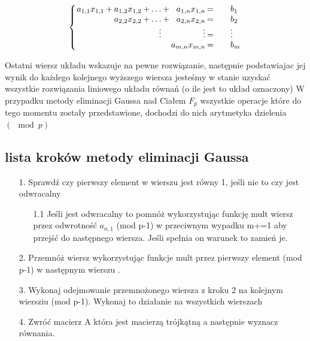 \documentclass{article}
\begin{document}
\begin{center}
\[
\setlength\arraycolsep{1pt}
\left\{
\begin{array}{rcrcrcrc@{\qquad}l}
a_{1,1}x_{1,1}  & +  &    a_{1,2}x_{1,2}    & + &   \ldots      & + &   a_{1,n}x_{1,n} &   =   &    b_{1} \\
                &    &   a_{2,2}x_{2,2}     & + &   \ldots      & + &   a_{2,n}x_{2,n} &   =   &    b_{2} \\
                &    &                      &   &   \vdots      &   &         \vdots   &   =   &    \vdots \\             
                &    &                      &   &               &   &   a_{m,n}x_{m,n} &   =   &    b_{m} \\
\end{array}
\right.
\]
\end{center}
 Ostatni wiersz układu wskazuje na pewne rozwiązanie, następnie podstawiajac jej wynik do każdego kolejnego wyższego wiersza jesteśmy w stanie uzyskać wszystkie rozwiązania liniowego układu równań (o ile jest to układ oznaczony)
\newline
\newline
W przypadku metody eliminacji Gaussa nad Ciałem \begin{math}  F_{p}  \end{math} wszystkie operacje które do tego momentu zostały przedstawione, dochodzi do nich arytmetyka dzielenia \begin{math}
    ( \mod p )
\end{math}
\newpage

\subsection{lista kroków metody eliminacji Gaussa} \label{Pseudokod Metody eliminacji Gaussa}
\begin{enumerate}
   \item[1.] Sprawdź czy pierwszy element w wierszu jest równy 1, jeśli nie to czy jest odwracalny
   \begin{enumerate}
       \item[1.1] Jeśli jest odwracalny to pomnóż wykorzystując funkcję mult wiersz przez odwrotność \begin{math}a_{n,1} \end{math} (mod p-1) w przeciwnym wypadku  m+=1 aby przejść do następnego wiersza. Jeśli spełnia on warunek to zamień je.
    \end{enumerate}
    \item[2.] Przemnóż wiersz wykorzystując funkcje mult przez pierwszy element (mod p-1) w następnym wierszu . 
    \item[3.] Wykonaj odejmowanie przemnożonego wiersza z kroku 2 na kolejnym wiersziu (mod p-1). Wykonaj to działanie na wszystkich wierszach 
    \item[4.] Zwróć macierz A która jest macierzą trójkątną a następnie wyznacz równania.
\end{enumerate}
\newpage
\end{document}

